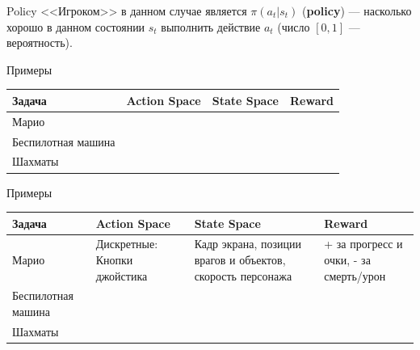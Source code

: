 \documentclass[aspectratio=169,12pt,t,compress]{beamer}
\begin{document}
\begin{frame}{Policy}
	<<Игроком>> в данном случае является $\pi(a_{t}|s_{t})$ (\textbf{policy}) --- насколько хорошо в данном состоянии $s_{t}$ выполнить действие $a_{t}$ (число $[0, 1]$ --- вероятность).
\end{frame}

\begin{frame}{Примеры}
	\centering
	\small
	\begin{tabular}{|p{2.2cm}|p{2.8cm}|p{4.0cm}|p{3cm}|}
		\hline
		\textbf{Задача}    & \textbf{Action Space} & \textbf{State Space} & \textbf{Reward} \\
		\hline
		Марио              &                       &                      &                 \\
		\hline
		Беспилотная машина &                       &                      &                 \\
		\hline
		Шахматы            &                       &                      &                 \\
		\hline
	\end{tabular}
\end{frame}

\begin{frame}{Примеры}
	\centering
	\small
	\begin{tabular}{|p{2.2cm}|p{2.8cm}|p{4.0cm}|p{3cm}|}
		\hline
		\textbf{Задача}    & \textbf{Action Space}        & \textbf{State Space}                                       & \textbf{Reward}                        \\
		\hline
		Марио              & Дискретные: Кнопки джойстика & Кадр экрана, позиции врагов и объектов, скорость персонажа & + за прогресс и очки, - за смерть/урон \\		\hline
		Беспилотная машина &                              &                                                            &                                        \\
		\hline
		Шахматы            &                              &                                                            &                                        \\
		\hline
	\end{tabular}
\end{frame}
\end{document}
